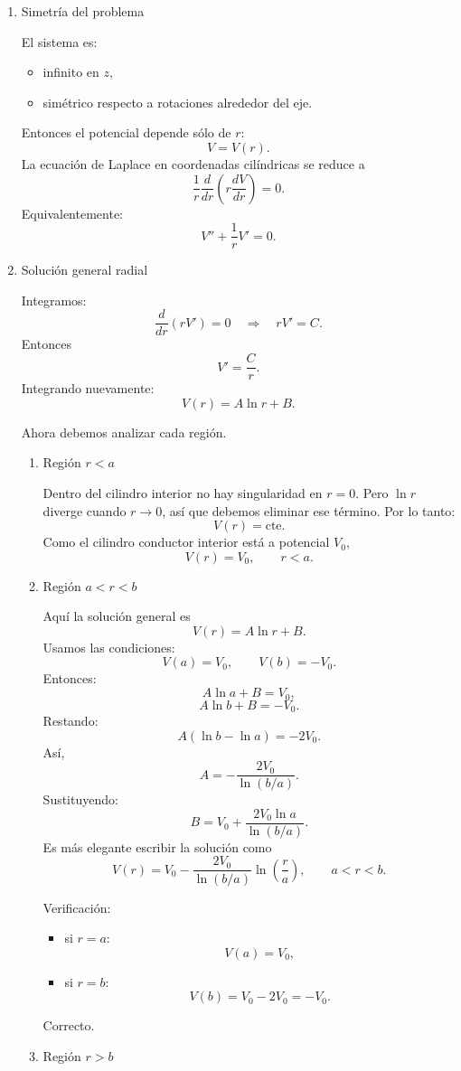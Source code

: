 \documentclass[11pt,spanish]{article}
\newcounter{problema}
\begin{document}
\begin{enumerate}
\item Simetría del problema

El sistema es:
\begin{itemize}
\item infinito en $z$,
\item simétrico respecto a rotaciones alrededor del eje.
\end{itemize}
Entonces el potencial depende sólo de $r$:
$$
V=V(r).
$$
La ecuación de Laplace en coordenadas cilíndricas se reduce a
$$
\frac1r\frac{d}{dr}
\left(
r\frac{dV}{dr}
\right)=0.
$$
Equivalentemente:
$$
V''+\frac1rV'=0.
$$

\item Solución general radial

Integramos:
$$
\frac{d}{dr}(rV')=0
\quad\Rightarrow\quad
rV'=C.
$$
Entonces
$$
V'=\frac{C}{r}.
$$
Integrando nuevamente:
$$
V(r)=A\ln r+B.
$$


Ahora debemos analizar cada región.
\begin{enumerate}
\item Región $r<a$

Dentro del cilindro interior no hay singularidad en $r=0$. Pero $\ln r$ diverge cuando $r\to0$, así que debemos eliminar ese término.
Por lo tanto:
$$
V(r)=\text{cte}.
$$
Como el cilindro conductor interior está a potencial $V_0$,
$$
\boxed{
V(r)=V_0,
\qquad r<a.
}
$$

\item Región $a<r<b$

Aquí la solución general es
$$
V(r)=A\ln r+B.
$$
Usamos las condiciones:
$$
V(a)=V_0,
\qquad
V(b)=-V_0.
$$
Entonces:
$$
A\ln a+B=V_0,
$$
$$
A\ln b+B=-V_0.
$$
Restando:
$$
A(\ln b-\ln a)=-2V_0.
$$
Así,
$$
A=
-\frac{2V_0}{\ln(b/a)}.
$$
Sustituyendo:
$$
B
=
V_0
+
\frac{2V_0\ln a}{\ln(b/a)}.
$$
Es más elegante escribir la solución como
$$
\boxed{
V(r)=
V_0
-
\frac{2V_0}{\ln(b/a)}
\ln\left(\frac{r}{a}\right),
\qquad
a<r<b.
}
$$

Verificación:
\begin{itemize}
\item si $r=a$:
$$
V(a)=V_0,
$$

\item si $r=b$:
$$
V(b)=V_0-2V_0=-V_0.
$$
\end{itemize}
Correcto.


\item Región $r>b$


\end{enumerate}
\end{enumerate}
\end{document}
